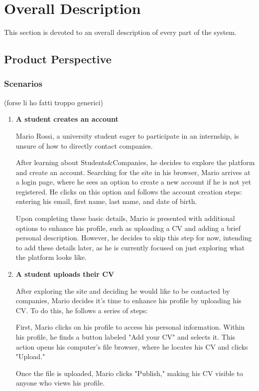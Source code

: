 \chapter{Overall Description}
This section is devoted to an overall description of every part of the system.

\section{Product Perspective}
\subsection{Scenarios}
(forse li ho fatti troppo generici)
\begin{enumerate} 
    \item \textbf{A student creates an account}

    Mario Rossi, a university student eager to participate in an internship, is unsure of how to directly contact companies. 
    
    After learning about Students\&Companies, he decides to explore the platform and create an account. Searching for the site in his browser, Mario arrives at a login page, where he sees an option to create a new account if he is not yet registered. He clicks on this option and follows the account creation steps: entering his email, first name, last name, and date of birth.
    
    Upon completing these basic details, Mario is presented with additional options to enhance his profile, such as uploading a CV and adding a brief personal description. However, he decides to skip this step for now, intending to add these details later, as he is currently focused on just exploring what the platform looks like.
    \item \textbf{A student uploads their CV}

    After exploring the site and deciding he would like to be contacted by companies, Mario decides it’s time to enhance his profile by uploading his CV. To do this, he follows a series of steps:

    First, Mario clicks on his profile to access his personal information. Within his profile, he finds a button labeled "Add your CV" and selects it. This action opens his computer's file browser, where he locates his CV and clicks "Upload." 
    
    Once the file is uploaded, Mario clicks "Publish," making his CV visible to anyone who views his profile.


\end{enumerate}
